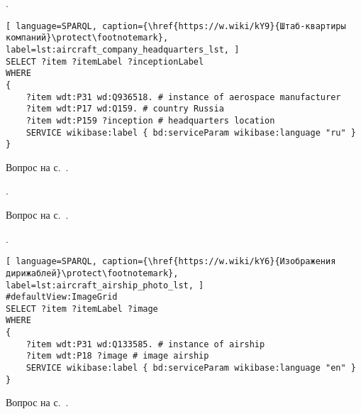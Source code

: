 \begin{task}
    \label{answer:aircraft_company_headquarters}
    . 
    
	\begin{lstlisting}[ language=SPARQL, caption={\href{https://w.wiki/kY9}{Штаб-квартиры компаний}\protect\footnotemark}, label=lst:aircraft_company_headquarters_lst, ]
SELECT ?item ?itemLabel ?inceptionLabel
WHERE
{
    ?item wdt:P31 wd:Q936518. # instance of aerospace manufacturer
  	?item wdt:P17 wd:Q159. # country Russia
  	?item wdt:P159 ?inception # headquarters location
    SERVICE wikibase:label { bd:serviceParam wikibase:language "ru" }
}
\end{lstlisting}
    
    \small{Вопрос на с.~\pageref{aircraft_question_3}.}
\end{task}

\begin{task}
    \label{answer:aircraft_question_airship}
    . 
    
    \small{Вопрос на с.~\pageref{aircraft_question_4}.}
\end{task}

\begin{task}
    \label{answer:aircraft_question_airship_2}
    . 
    
	\begin{lstlisting}[ language=SPARQL, caption={\href{https://w.wiki/kY6}{Изображения дирижаблей}\protect\footnotemark}, label=lst:aircraft_airship_photo_lst, ]
#defaultView:ImageGrid
SELECT ?item ?itemLabel ?image
WHERE
{
    ?item wdt:P31 wd:Q133585. # instance of airship
  	?item wdt:P18 ?image # image airship
    SERVICE wikibase:label { bd:serviceParam wikibase:language "en" }
}
\end{lstlisting}
    
    \small{Вопрос на с.~\pageref{aircraft_question_5}.}
\end{task}

